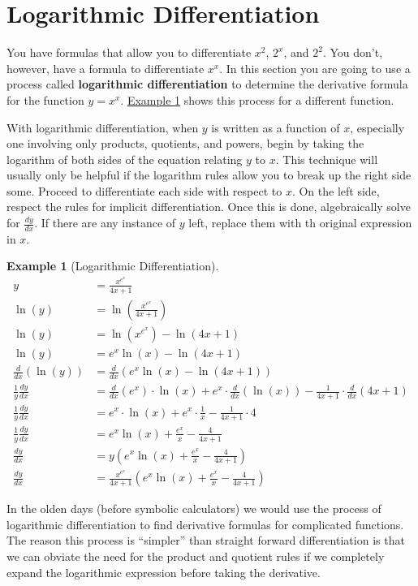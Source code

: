 \documentclass[10pt,oneside,]{book}
\newcommand{\terminology}[1]{\textbf{#1}}
\theoremstyle{plain}
\theoremstyle{definition}
\newtheorem{example}[theorem]{Example}
\numberwithin{equation}{section}
\newcommand{\fe}[2]{#1\mathopen{}\left(#2\right)\mathclose{}}
\newcommand{\lz}[2]{\frac{d#1}{d#2}}
\newcommand{\lzoo}[2]{{\frac{d}{d#1}}{\left(#2\right)}}
\begin{document}
\section[Logarithmic Differentiation]{Logarithmic Differentiation}\label{section-logarithmic-differentiation}
You have formulas that allow you to differentiate \(x^2\), \(2^x\), and \(2^2\).  You don't, however, have a formula to differentiate \(x^x\).  In this section you are going to use a process called \terminology{logarithmic differentiation} to determine the derivative formula for the function \(y=x^x\).  \hyperref[example-logarithmic-differentitation]{Example \ref{example-logarithmic-differentitation}} shows this process for a different function.%
\par
With logarithmic differentiation, when \(y\) is written as a function of \(x\), especially one involving only products, quotients, and powers, begin by taking the logarithm of both sides of the equation relating \(y\) to \(x\). This technique will usually only be helpful if the logarithm rules allow you to break up the right side some. Proceed to differentiate each side with respect to \(x\). On the left side, respect the rules for implicit differentiation. Once this is done, algebraically solve for \(\lz{y}{x}\). If there are any instance of \(y\) left, replace them with th original expression in \(x\).%
\begin{example}[Logarithmic Differentiation]\label{example-logarithmic-differentitation}
\begin{align*}
y&=\frac{x^{e^x}}{4x+1}\\
\fe{\ln}{y}&=\fe{\ln}{\frac{x^{e^x}}{4x+1}}\\
\fe{\ln}{y}&=\fe{\ln}{x^{e^x}}-\fe{\ln}{4x+1}\\
\fe{\ln}{y}&=e^x\fe{\ln}{x}-\fe{\ln}{4x+1}\\
\lzoo{x}{\fe{\ln}{y}}&=\lzoo{x}{e^x\fe{\ln}{x}-\fe{\ln}{4x+1}}\\
\frac{1}{y}\lz{y}{x}&=\lzoo{x}{e^x}\cdot\fe{\ln}{x}+e^x\cdot\lzoo{x}{\fe{\ln}{x}}-\frac{1}{4x+1}\cdot\lzoo{x}{4x+1}\\
\frac{1}{y}\lz{y}{x}&=e^x\cdot\fe{\ln}{x}+e^x\cdot\frac{1}{x}-\frac{1}{4x+1}\cdot4\\
\frac{1}{y}\lz{y}{x}&=e^x\fe{\ln}{x}+\frac{e^x}{x}-\frac{4}{4x+1}\\
\lz{y}{x}&=y\left(e^x\fe{\ln}{x}+\frac{e^x}{x}-\frac{4}{4x+1}\right)\\
\lz{y}{x}&=\frac{x^{e^x}}{4x+1}\left(e^x\fe{\ln}{x}+\frac{e^x}{x}-\frac{4}{4x+1}\right)
\end{align*}%
\end{example}
\par
In the olden days (before symbolic calculators) we would use the process of logarithmic differentiation to find derivative formulas for complicated functions.  The reason this process is ``simpler'' than straight forward differentiation is that we can obviate the need for the product and quotient rules if we completely expand the logarithmic expression before taking the derivative.%
\typeout{************************************************}
\typeout{************************************************}
\end{document}
